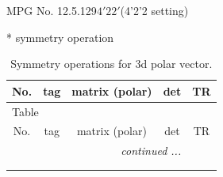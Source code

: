 \documentclass[fleqn,8pt]{jsarticle}
\begin{document}
\setcounter{MaxMatrixCols}{32}

\renewcommand{\tablename}{Table~}
\renewcommand{\figurename}{Figure~}
\begin{center}
\LARGE
MPG No. 12.5.129\quad$4'22'$\quad(4'2'2 setting)
\end{center}
* symmetry operation
\renewcommand{\arraystretch}{1.3}
\begin{longtable}{ccccc}
\caption{Symmetry operations for 3d polar vector.}
 \\
 \hline \hline
No. & tag & matrix (polar) & det & TR \\ \hline \endfirsthead

\multicolumn{4}{l}{\tablename\ \thetable{}} \\
 \hline \hline
No. & tag & matrix (polar) & det & TR \\ \hline \endhead

 \hline \hline
\multicolumn{4}{r}{\footnotesize\it continued ...} \\ \endfoot

 \hline \hline
\multicolumn{4}{r}{} \\ \endlastfoot


\end{longtable}
\end{document}
